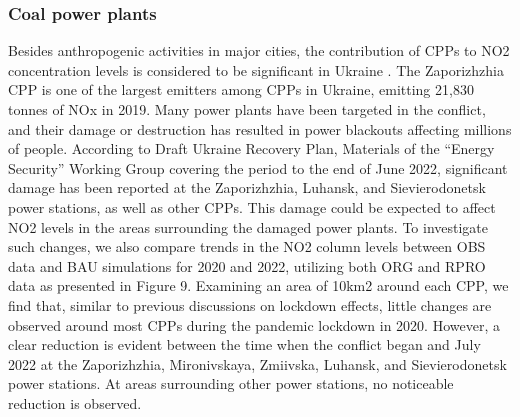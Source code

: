 \subsubsection*{Coal power plants}
Besides anthropogenic activities in major cities, the contribution of CPPs to NO2 concentration levels is considered to be significant in Ukraine \citep{lauri2021}. The Zaporizhzhia CPP is one of the largest emitters among CPPs in Ukraine, emitting 21,830 tonnes of NOx in 2019. Many power plants have been targeted in the conflict, and their damage or destruction has resulted in power blackouts affecting millions of people. According to Draft Ukraine Recovery Plan, Materials of the “Energy Security” Working Group covering the period to the end of June 2022, significant damage has been reported at the Zaporizhzhia, Luhansk, and Sievierodonetsk power stations, as well as other CPPs. This damage could be expected to affect NO2 levels in the areas surrounding the damaged power plants. To investigate such changes, we also compare trends in the NO2 column levels between OBS data and BAU simulations for 2020 and 2022, utilizing both ORG and RPRO data as presented in Figure 9. Examining an area of 10km2 around each CPP, we find that, similar to previous discussions on lockdown effects, little changes are observed around most CPPs during the pandemic lockdown in 2020. However, a clear reduction is evident between the time when the conflict began and July 2022 at the Zaporizhzhia, Mironivskaya, Zmiivska, Luhansk, and Sievierodonetsk power stations. At areas surrounding other power stations, no noticeable reduction is observed.\par

